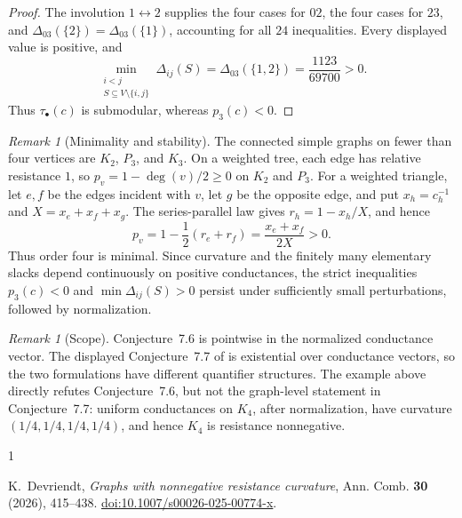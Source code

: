 \documentclass[11pt]{amsart}
\theoremstyle{remark}
\newtheorem{remark}[theorem]{Remark}
\begin{document}
\begin{proof}
The involution $1\leftrightarrow2$ supplies the four cases for $02$, the four
cases for $23$, and
$\Delta_{03}(\{2\})=\Delta_{03}(\{1\})$, accounting for all $24$
inequalities. Every displayed value is positive, and
\[
 \min_{\substack{i<j\\S\subseteq V\setminus\{i,j\}}}
 \Delta_{ij}(S)
 =\Delta_{03}(\{1,2\})
 =\frac{1123}{69700}>0.
\]
Thus $\tau_\bullet(c)$ is submodular, whereas $p_3(c)<0$.
\end{proof}

\begin{remark}[Minimality and stability]
The connected simple graphs on fewer than four vertices are $K_2$, $P_3$,
and $K_3$. On a weighted tree, each edge has relative resistance $1$, so
$p_v=1-\deg(v)/2\ge0$ on $K_2$ and $P_3$. For a weighted triangle, let
$e,f$ be the edges incident with $v$, let $g$ be the opposite edge, and put
$x_h=c_h^{-1}$ and $X=x_e+x_f+x_g$. The series-parallel law gives
$r_h=1-x_h/X$, and hence
\[
 p_v=1-\frac12(r_e+r_f)=\frac{x_e+x_f}{2X}>0.
\]
Thus order four is minimal. Since curvature and the finitely many elementary
slacks depend continuously on positive conductances, the strict inequalities
$p_3(c)<0$ and $\min\Delta_{ij}(S)>0$ persist under sufficiently small
perturbations, followed by normalization.
\end{remark}

\begin{remark}[Scope]
Conjecture~7.6 is pointwise in the normalized conductance vector. The
displayed Conjecture~7.7 of \cite{Devriendt} is existential over conductance
vectors, so the two formulations have different quantifier structures. The
example above directly refutes Conjecture~7.6, but not the graph-level
statement in Conjecture~7.7: uniform conductances on $K_4$, after
normalization, have curvature $(1/4,1/4,1/4,1/4)$, and hence $K_4$ is
resistance nonnegative.
\end{remark}

\begin{thebibliography}{1}

K.~Devriendt,
\emph{Graphs with nonnegative resistance curvature},
Ann. Comb. \textbf{30} (2026), 415--438.
\href{https://doi.org/10.1007/s00026-025-00774-x}
{doi:10.1007/s00026-025-00774-x}.

\end{thebibliography}
\end{document}
